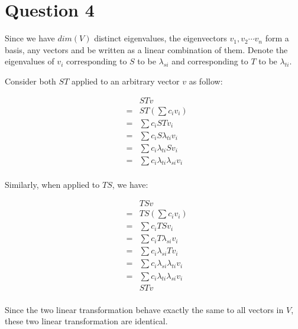 \section*{Question 4}
Since we have $ dim(V) $ distinct eigenvalues, the eigenvectors $ v_1, v_2 \cdots v_n $ form a basis, any vectors and be written as a linear combination of them. Denote the eigenvalues of $ v_i $ corresponding to $ S $ to be $ \lambda_{si} $ and corresponding to $ T $ to be $ \lambda_{ti} $.

Consider both $ ST $ applied to an arbitrary vector $ v $ as follow:

\begin{eqnarray*}
  & & ST v \\
  &=& ST (\sum c_i v_i) \\
  &=& \sum c_i ST v_i \\
  &=& \sum c_i S \lambda_{ti}v_i \\
  &=& \sum c_i \lambda_{ti} S v_i \\
  &=& \sum c_i \lambda_{ti} \lambda_{si} v_i \\
\end{eqnarray*}

Similarly, when applied to $ TS $, we have:

\begin{eqnarray*}
  & & TS v \\
  &=& TS (\sum c_i v_i) \\
  &=& \sum c_i TS v_i \\
  &=& \sum c_i T \lambda_{si}v_i \\
  &=& \sum c_i \lambda_{si} T v_i \\
  &=& \sum c_i \lambda_{si} \lambda_{ti} v_i \\
  &=& \sum c_i \lambda_{ti} \lambda_{si} v_i \\
  & & ST v \\
\end{eqnarray*}

Since the two linear transformation behave exactly the same to all vectors in $ V $, these two linear transformation are identical.